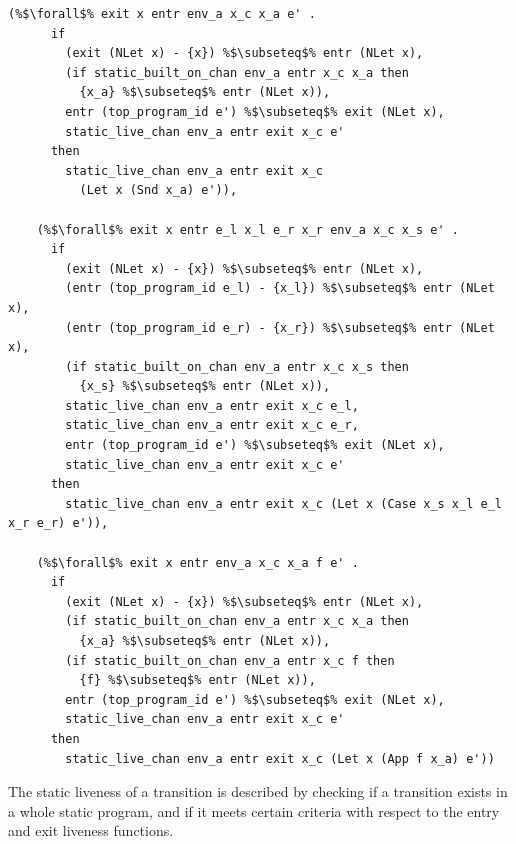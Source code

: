 \documentclass{article}
\begin{document}
\begin{lstlisting}[language=logic, escapechar=\%]
    (%$\forall$% exit x entr env_a x_c x_a e' .
      if 
        (exit (NLet x) - {x}) %$\subseteq$% entr (NLet x),
        (if static_built_on_chan env_a entr x_c x_a then
          {x_a} %$\subseteq$% entr (NLet x)),
        entr (top_program_id e') %$\subseteq$% exit (NLet x),
        static_live_chan env_a entr exit x_c e'
      then
        static_live_chan env_a entr exit x_c
          (Let x (Snd x_a) e')),

    (%$\forall$% exit x entr e_l x_l e_r x_r env_a x_c x_s e' .
      if 
        (exit (NLet x) - {x}) %$\subseteq$% entr (NLet x),
        (entr (top_program_id e_l) - {x_l}) %$\subseteq$% entr (NLet x),
        (entr (top_program_id e_r) - {x_r}) %$\subseteq$% entr (NLet x),
        (if static_built_on_chan env_a entr x_c x_s then
          {x_s} %$\subseteq$% entr (NLet x)),
        static_live_chan env_a entr exit x_c e_l,
        static_live_chan env_a entr exit x_c e_r,
        entr (top_program_id e') %$\subseteq$% exit (NLet x),
        static_live_chan env_a entr exit x_c e'
      then 
        static_live_chan env_a entr exit x_c (Let x (Case x_s x_l e_l x_r e_r) e')),

    (%$\forall$% exit x entr env_a x_c x_a f e' .
      if
        (exit (NLet x) - {x}) %$\subseteq$% entr (NLet x),
        (if static_built_on_chan env_a entr x_c x_a then
          {x_a} %$\subseteq$% entr (NLet x)),
        (if static_built_on_chan env_a entr x_c f then
          {f} %$\subseteq$% entr (NLet x)),
        entr (top_program_id e') %$\subseteq$% exit (NLet x),
        static_live_chan env_a entr exit x_c e'
      then
        static_live_chan env_a entr exit x_c (Let x (App f x_a) e'))
  \end{lstlisting}

The static liveness of a transition is described by checking if a transition exists in a whole
static program, and if it meets certain criteria with respect to the entry and exit liveness
functions. 
\end{document}
